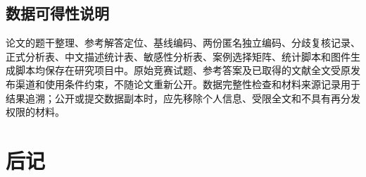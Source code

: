\documentclass[
  12pt,
  a4paper,twoside,openany]{ctexbook}
\begin{document}
\section{数据可得性说明}\label{ux6570ux636eux53efux5f97ux6027ux8bf4ux660e}

论文的题干整理、参考解答定位、基线编码、两份匿名独立编码、分歧复核记录、正式分析表、中文描述统计表、敏感性分析表、案例选择矩阵、统计脚本和图件生成脚本均保存在研究项目中。原始竞赛试题、参考答案及已取得的文献全文受原发布渠道和使用条件约束，不随论文重新公开。数据完整性检查和材料来源记录用于结果追溯；公开或提交数据副本时，应先移除个人信息、受限全文和不具有再分发权限的材料。

\backmatter
\clearpage
\chapter*{后记}
\thispagestyle{fancy}
\vspace*{1cm}
\end{document}
